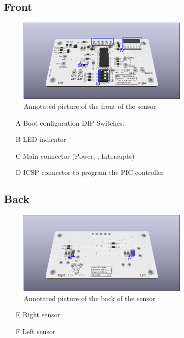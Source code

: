 \subsection{Front}
\begin{figure}[h!]
 \centering
 \includegraphics[width=0.75\textwidth]{../img/annotated-layout-front-V1.png}
 \caption{Annotated picture of the front of the sensor}
\end{figure}
\begin{itemize}
 \item[A] Boot configuration DIP Switches.
 \item[B] LED indicator
 \item[C] Main connector (Power, \iic, Interrupts)
 \item[D] ICSP connector to program the PIC controller
\end{itemize}


\subsection{Back}
\begin{figure}[H]
 \centering
 \includegraphics[width=0.75\textwidth]{../img/annotated-layout-back-V1.png}
 \caption{Annotated picture of the back of the sensor}
\end{figure}
\begin{itemize}
 \item[E] Right sensor
 \item[F] Left sensor
\end{itemize}
